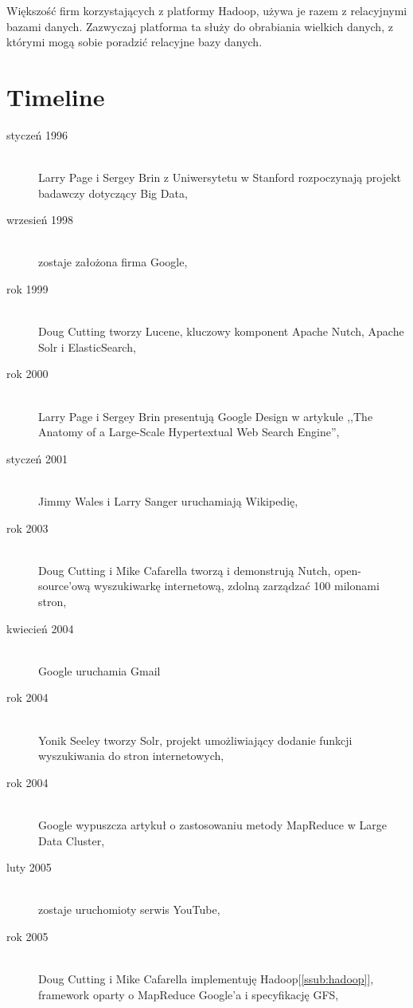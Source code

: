 \documentclass[twocolumn]{svjour3}          %
\begin{document}
Większość firm korzystających z platformy Hadoop, używa je razem z relacyjnymi bazami danych. Zazwyczaj platforma ta służy do obrabiania wielkich danych, z którymi mogą sobie poradzić relacyjne bazy danych.

\section{Timeline}
\label{sub:timeline}
\begin{description}
    \item[styczeń 1996] \hfill \\ Larry Page i Sergey Brin z Uniwersytetu w Stanford rozpoczynają projekt badawczy dotyczący Big Data,
    \item[wrzesień 1998] \hfill \\ zostaje założona firma Google,
    \item[rok 1999] \hfill \\ Doug Cutting tworzy Lucene, kluczowy komponent Apache Nutch, Apache Solr i ElasticSearch,
    \item[rok 2000] \hfill \\ Larry Page i Sergey Brin presentują Google Design w artykule ,,The Anatomy of a Large-Scale Hypertextual Web Search Engine'',
    \item[styczeń 2001] \hfill \\ Jimmy Wales i Larry Sanger uruchamiają Wikipedię,
    \item[rok 2003] \hfill \\ Doug Cutting i Mike Cafarella tworzą i demonstrują Nutch, open-source'ową wyszukiwarkę internetową, zdolną zarządzać 100 milonami stron,
    \item[kwiecień 2004] \hfill \\ Google uruchamia Gmail
    \item[rok 2004] \hfill \\ Yonik Seeley tworzy Solr, projekt umożliwiający dodanie funkcji wyszukiwania do stron internetowych,
    \item[rok 2004] \hfill \\ Google wypuszcza artykuł o zastosowaniu metody MapReduce w Large Data Cluster,
    \item[luty 2005] \hfill \\ zostaje uruchomioty serwis YouTube,
    \item[rok 2005] \hfill \\ Doug Cutting i Mike Cafarella implementuję Hadoop[\ref{ssub:hadoop}], framework oparty o MapReduce Google'a i specyfikację GFS,

\end{description}
\end{document}

